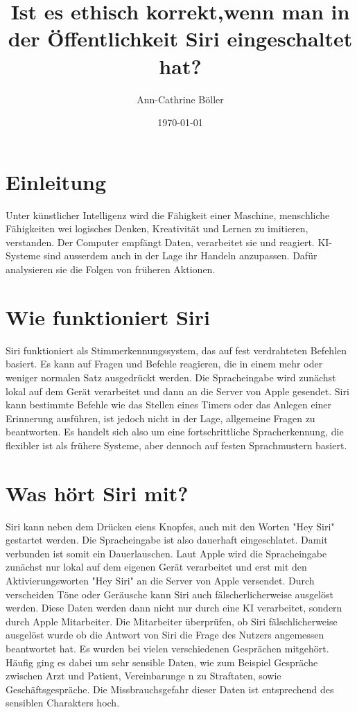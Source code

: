 \documentclass{article}
\title{Ist es ethisch korrekt,wenn man in der Öffentlichkeit Siri eingeschaltet hat?}
\author{Ann-Cathrine Böller}
\date{\today}
\begin{document}
\maketitle


     

\tableofcontents

\section{Einleitung}
Unter künstlicher Intelligenz wird die Fähigkeit einer Maschine, menschliche Fähigkeiten wei logisches Denken, Kreativität und Lernen zu imitieren, verstanden.
Der Computer empfängt Daten, verarbeitet sie und reagiert. KI-Systeme sind ausserdem auch in der Lage ihr Handeln anzupassen. Dafür analysieren sie die Folgen von früheren Aktionen.

\section{Wie funktioniert Siri}
Siri funktioniert als Stimmerkennungssystem, das auf fest verdrahteten Befehlen basiert. Es kann auf Fragen und Befehle reagieren, die in einem mehr oder weniger normalen Satz ausgedrückt werden. Die Spracheingabe wird zunächst lokal auf dem Gerät verarbeitet und dann an die Server von Apple gesendet. Siri kann bestimmte Befehle wie das Stellen eines Timers oder das Anlegen einer Erinnerung ausführen, ist jedoch nicht in der Lage, allgemeine Fragen zu beantworten. Es handelt sich also um eine fortschrittliche Spracherkennung, die flexibler ist als frühere Systeme, aber dennoch auf festen Sprachmustern basiert.

\section{Was hört Siri mit?}
Siri kann neben dem Drücken eiens Knopfes, auch mit den Worten "Hey Siri" gestartet werden. Die Spracheingabe ist also dauerhaft eingeschlatet. Damit verbunden ist somit ein Dauerlauschen. Laut Apple wird die Spracheingabe zunächst nur lokal auf dem eigenen Gerät verarbeitet und erst mit den Aktivierungsworten "Hey Siri" an die Server von Apple versendet. Durch verscheiden Töne oder Geräusche kann Siri auch fälscherlicherweise ausgelöst werden. Diese Daten werden dann nicht nur durch eine KI verarbeitet, sondern durch Apple Mitarbeiter. Die Mitarbeiter überprüfen, ob Siri fälschlicherweise ausgelöst wurde ob die Antwort von Siri die Frage des Nutzers angemessen beantwortet hat.
Es wurden bei vielen verschiedenen Gesprächen mitgehört. Häufig ging es dabei um sehr sensible Daten, wie zum Beispiel Gespräche zwischen Arzt und Patient, Vereinbarunge n zu Straftaten, sowie Geschäftsgespräche. Die Missbrauchsgefahr dieser Daten ist entsprechend des sensiblen Charakters hoch. 
\end{document}
